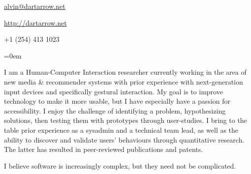 \documentclass[a4paper]{scrartcl}
\newcommand{\Description}[1]{\hangindent=0em\hangafter=0\noindent\footnotesize{#1}\par\normalsize\vspace{1em}} %
\newcommand{\Redvline}[0]{\vspace{0em}\noindent{\color{ThemeColor}\rule{18cm}{0.4pt}}\vspace{-0.5em}}
\newcommand{\MyName}[1]{\noindent{\textsc{\LARGE{\color{ThemeColor}#1}}}} %
\newcommand{\BlockTitle}[1]{\textsc{\vspace{0.15em}}\noindent{\spacedlowsmallcaps{#1}}\vspace{1em}}
\begin{document}
\thispagestyle{empty} %


\MyName{Alvin Jude} %



\begin{multicols}{3}
\href{mailto:alvin@dartarrow.net}{alvin@dartarrow.net} %

\columnbreak

\begin{center}
\href{http://dartarrow.net}{http://dartarrow.net} %
\end{center}

\columnbreak

\begin{flushright}
+1 (254) 413 1023
\end{flushright}

\end{multicols}

\Redvline
\vspace{1em} %


\Description{I am a Human-Computer Interaction researcher currently working in the area of new media \& recommender systems with prior experience with next-generation input devices and specifically gestural interaction.
My goal is to improve technology to make it more usable, but I have especially have a passion for accessibility.
I enjoy the challenge of identifying a problem, hypothesizing solutions, then testing them with prototypes through user-studies.
I bring to the table prior experience as a sysadmin and a technical team lead, as well as the ability to discover and validate users' behaviours through quantitative research.
The latter has resulted in peer-reviewed publications and patents.

I believe software is increasingly complex, but they need not be complicated.
}

\Redvline
\end{document}
